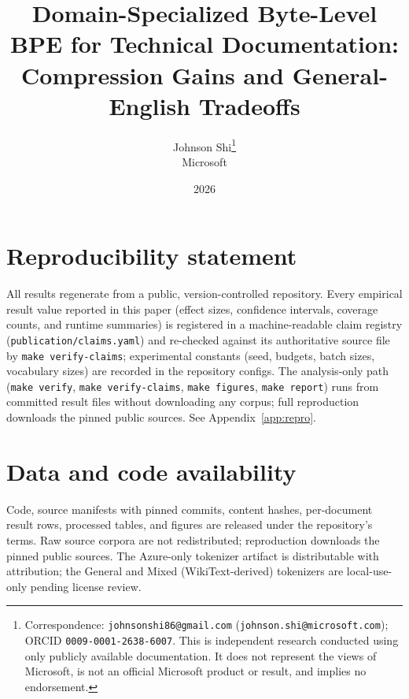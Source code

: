 \documentclass[11pt]{article}
\title{\textbf{Domain-Specialized Byte-Level BPE for Technical Documentation:\\
Compression Gains and General-English Tradeoffs}}
\author{%
  Johnson Shi\thanks{Correspondence: \texttt{johnsonshi86@gmail.com}
  (\texttt{johnson.shi@microsoft.com}); ORCID \texttt{0009-0001-2638-6007}. This
  is independent research conducted using only publicly available documentation.
  It does not represent the views of Microsoft, is not an official Microsoft
  product or result, and implies no endorsement.}\\
  Microsoft
}
\date{2026}
\begin{document}
\maketitle















\section*{Reproducibility statement}
All results regenerate from a public, version-controlled repository. Every
empirical result value reported in this paper (effect sizes, confidence intervals,
coverage counts, and runtime summaries) is registered in a machine-readable claim
registry (\texttt{publication/claims.yaml}) and re-checked against its
authoritative source file by \texttt{make verify-claims}; experimental constants
(seed, budgets, batch sizes, vocabulary sizes) are recorded in the repository
configs. The analysis-only path (\texttt{make verify},
\texttt{make verify-claims}, \texttt{make figures}, \texttt{make report}) runs from
committed result files without downloading any corpus; full reproduction downloads
the pinned public sources. See Appendix~\ref{app:repro}.

\section*{Data and code availability}
Code, source manifests with pinned commits, content hashes, per-document result
rows, processed tables, and figures are released under the repository's terms.
Raw source corpora are not redistributed; reproduction downloads the pinned public
sources. The Azure-only tokenizer artifact is distributable with attribution; the
General and Mixed (WikiText-derived) tokenizers are local-use-only pending license
review.




\appendix






\end{document}
